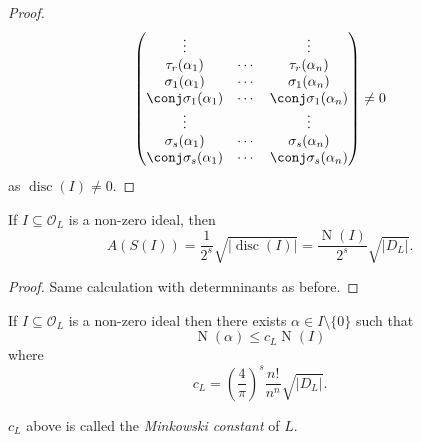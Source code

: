 \documentclass[a4paper]{article}
\renewcommand*{\O}{\mathcal{O}}
\DeclareMathOperator{\n}{N}
\DeclareMathOperator{\disc}{disc}
\begin{document}
\begin{proof}
\[\begin{pmatrix}
      \vdots & & \vdots \\
      \tau_r(\alpha_1) & \cdots & \tau_r(\alpha_n) \\
      \sigma_1(\alpha_1) & \cdots & \sigma_1(\alpha_n) \\
      \conj \sigma_1(\alpha_1) & \cdots & \conj \sigma_1(\alpha_n) \\
      \vdots & & \vdots \\
      \sigma_s(\alpha_1) & \cdots & \sigma_s(\alpha_n) \\
      \conj \sigma_s(\alpha_1) & \cdots & \conj \sigma_s(\alpha_n) \\
    \end{pmatrix}
    \neq 0
  \]
  as \(\disc(I) \neq 0\).
\end{proof}

\begin{lemma}
  If \(I \subseteq \O_L\) is a non-zero ideal, then
  \[
    A(S(I)) = \frac{1}{2^s} \sqrt{|\disc(I)|} = \frac{\n(I)}{2^s} \sqrt{|D_L|}.
  \]
\end{lemma}

\begin{proof}
  Same calculation with determninants as before.
\end{proof}

\begin{proposition}
  If \(I \subseteq \O_L\) is a non-zero ideal then there exists \(\alpha \in I \setminus \{0\}\) such that
  \[
    \n(\alpha) \leq c_L \n(I)
  \]
  where
  \[
    c_L = \left( \frac{4}{\pi} \right)^s \frac{n!}{n^n} \sqrt{|D_L|}.
  \]
\end{proposition}

\begin{definition}
  \(c_L\) above is called the \emph{Minkowski constant} of \(L\).
\end{definition}
\end{document}
